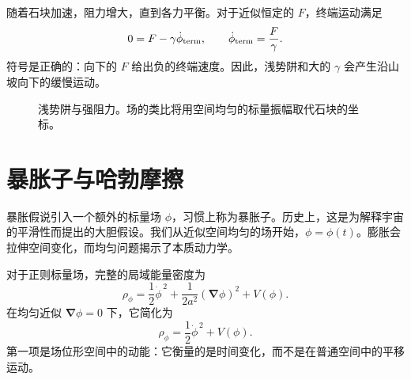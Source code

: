 随着石块加速，阻力增大，直到各力平衡。对于近似恒定的 \(F\)，终端运动满足
\begin{equation}
0=F-\gamma\dot\phi_{\rm term},
\qquad
\dot\phi_{\rm term}=\frac{F}{\gamma}.
\end{equation}
符号是正确的：向下的 \(F\) 给出负的终端速度。因此，浅势阱和大的 \(\gamma\) 会产生沿山坡向下的缓慢运动。

\begin{figure}[htbp]
\centering
{}
\caption{浅势阱与强阻力。场的类比将用空间均匀的标量振幅取代石块的坐标。}
\label{fig:c08-shallow-potential}
\end{figure}

\section{暴胀子与哈勃摩擦}

暴胀假说引入一个额外的标量场 \(\phi\)，习惯上称为暴胀子。历史上，这是为解释宇宙的平滑性而提出的大胆假设。我们从近似空间均匀的场开始，\(\phi=\phi(t)\)。膨胀会拉伸空间变化，而均匀问题揭示了本质动力学。

对于正则标量场，完整的局域能量密度为
\begin{equation}
\rho_\phi
=
\frac12\dot\phi^{\,2}
+\frac{1}{2a^2}(\boldsymbol\nabla\phi)^2
+V(\phi).
\end{equation}
在均匀近似 \(\boldsymbol\nabla\phi=0\) 下，它简化为
\begin{equation}
\rho_\phi=\frac12\dot\phi^{\,2}+V(\phi).
\label{eq:c08-scalar-density}
\end{equation}
第一项是场位形空间中的动能：它衡量的是时间变化，而不是在普通空间中的平移运动。

\begin{classroomqa}
\end{classroomqa}


